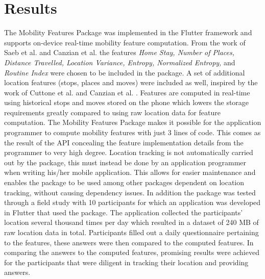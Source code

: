 \section{Results}
The Mobility Features Package was implemented in the Flutter framework and supports on-device real-time mobility feature computation. From the work of Saeb et al. \cite{Saeb2015} and Canzian et al. \cite{Canzian2015} the features \textit{Home Stay, Number of Places, Distance Travelled, Location Variance, Entropy, Normalized Entropy,} and \textit{Routine Index} were chosen to be included in the package. A set of additional location features (stops, places and moves) were included as well, inspired by the work of Cuttone et al. \cite{sparse-location-2014} and Canzian et al. \cite{Canzian2015}. Features are computed in real-time using historical stops and moves stored on the phone which lowers the storage requirements greatly compared to using raw location data for feature computation. The Mobility Features Package makes it possible for the application programmer to compute mobility features with just 3 lines of code. This comes as the result of the API concealing the feature implementation details from the programmer to very high degree. Location tracking is not automatically carried out by the package, this must instead be done by an application programmer when writing his/her mobile application. This allows for easier maintenance and enables the package to be used among other packages dependent on location tracking, without causing dependency issues. In addition the package was tested through a field study with 10 participants for which an application was developed in Flutter that used the package. The application collected the participants' location several thousand times per day which resulted in a dataset of 240 MB of raw location data in total. Participants filled out a daily questionnaire pertaining to the features, these answers were then compared to the computed features. In comparing the answers to the computed features, promising results were achieved for the participants that were diligent in tracking their location and providing answers. 